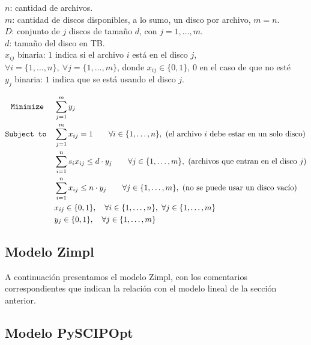 \documentclass[11pt, a4paper, pdftex]{article}
\begin{document}
$n$: cantidad de archivos. \\

$m$: cantidad de discos disponibles, a lo sumo, un disco por archivo, $m = n$. \\

$D$: conjunto de $j$ discos de tamaño $d$, con $j = 1, \ldots, m$. \\

$d$: tamaño del disco en TB. \\ 

$x_{ij}$ binaria: $1$ indica si el archivo $i$ está en el disco $j$, $\forall i = \{1, \ldots, n\},\ \forall j = \{1, \ldots, m\}$, donde $x_{ij} \in \{0, 1\}$, $0$ en el caso de que no esté\\

$y_{j}$ binaria: $1$ indica que se está usando el disco $j$.

\begin{alignat*}{2}
	\minimize
	& \sum_{j = 1}^{m} y_{j}\\
	\subjto
	& \sum_{j = 1}^{m} x_{ij} = 1 \qquad \forall i \in \{1, \ldots, n\},\ \text{(el archivo $i$ debe estar en un solo disco)}\\
	& \sum_{i = 1}^{n} s_{i} x_{ij} \le d\cdot y_{j} \qquad \forall j \in \{1, \ldots, m\},\ \text{(archivos que entran en el disco $j$)}\\
	& \sum_{i = 1}^{n} x_{ij} \le n\cdot y_{j} \qquad \forall j \in \{1, \ldots, m\},\ \text{(no se puede usar un disco vacío)}\\
	& x_{ij} \in \{0,1\}, \quad \forall i \in \{1, \ldots, n\}, \ \forall j \in \{1, \ldots, m\}\\
	& y_{j} \in \{0,1\}, \quad \forall j \in \{1, \ldots, m\}
\end{alignat*}

\subsection{Modelo Zimpl}

A continuación presentamos el modelo Zimpl, con los comentarios
correspondientes que indican la relación con el modelo lineal de la sección
anterior.

\newpage


\newpage
\subsection{Modelo PySCIPOpt}
\end{document}
